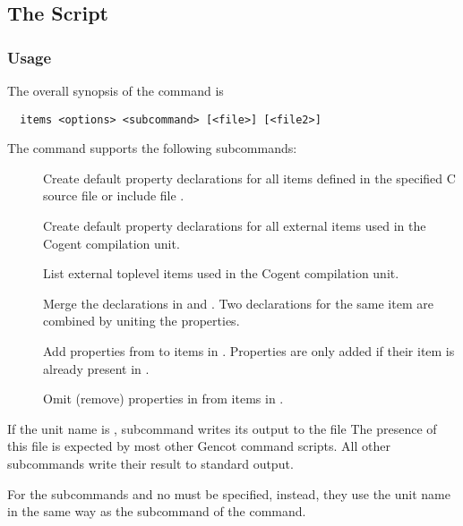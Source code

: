 \subsection{The  Script}
\label{impl-all-items}

\subsubsection{Usage}

The overall synopsis of the  command is
\begin{verbatim}
  items <options> <subcommand> [<file>] [<file2>]
\end{verbatim}

The  command supports the following subcommands:
\begin{description}
\item[] Create default property declarations for all items defined in the specified C source file
or include file . 

\item[] Create default property declarations for all external items used in the Cogent compilation 
unit. 

\item[] List external toplevel items used in the Cogent compilation unit. 

\item[] Merge the declarations in  and . Two declarations for the 
same item are combined by uniting the properties.

\item[] Add properties from  to items in . Properties are only added
if their item is already present in .

\item[] Omit (remove) properties in  from items in . 

\end{description}

If the unit name is , subcommand  writes its output to the file 
The presence of this file is expected by most other Gencot command scripts. All other subcommands write their result to 
standard output.

For the subcommands  and  no  must be specified, instead, they use the unit name
in the same way as the subcommand  of the  command.

